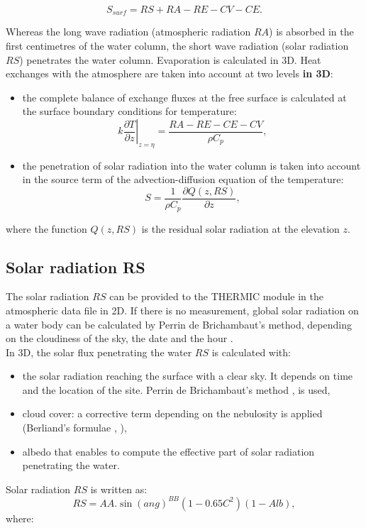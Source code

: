 \begin{equation}
  S_{surf} = RS + RA - RE - CV - CE.
\end{equation}

Whereas the long wave radiation (atmospheric radiation $RA$) is absorbed in
the first centimetres of the water column, the short wave radiation (solar
radiation $RS$) penetrates the water column. Evaporation is calculated in 3D.
Heat exchanges with the atmosphere are taken into account at two levels \textbf{in 3D}:
\begin{itemize}
\item the complete balance of exchange fluxes at the free surface is
calculated at the surface boundary conditions for temperature:
\begin{equation}
k \left.  \dfrac{\partial T}{\partial z}\right|_{z=\eta} =
\dfrac{RA-RE-CE-CV}{\rho C_p},
\end{equation}
\item the penetration of solar radiation into the water column is taken into
account in the source term of the advection-diffusion equation of the
temperature:
\begin{equation}
S=\dfrac{1}{\rho C_p}\dfrac{\partial Q(z,RS)}{\partial z},
\end{equation}
\end{itemize}
where the function $Q(z, RS)$ is the residual solar radiation at the elevation $z$.

\subsection{Solar radiation RS}

The solar radiation $RS$ can be provided to the THERMIC module
in the atmospheric data file in 2D.
If there is no measurement, global solar radiation on a water body
can be calculated by Perrin de Brichambaut's method,
depending on the cloudiness of the sky, the date and the hour
\cite{klein_ray_solaire_1979}.\\

In 3D, the solar flux penetrating the water $RS$ is calculated with:
\begin{itemize}
\item the solar radiation reaching the surface with a clear sky. It depends on
time and the location of the site. Perrin de Brichambaut's method
\cite{perrin_ray_solaire_1963}, \cite{perrin_res_solaires_1975} is used,
\item cloud cover: a corrective term depending on the nebulosity is applied
(Berliand's formulae \cite{berliand_cloud_1952}, \cite{berliand_radiatssi_1960}),
\item albedo that enables to compute the effective part of solar radiation
penetrating the water.
\end{itemize}
Solar radiation $RS$ is written as:
\begin{equation}
RS = AA.\sin(ang)^{BB}(1-0.65C^{2})(1-Alb),
\end{equation}
where:

